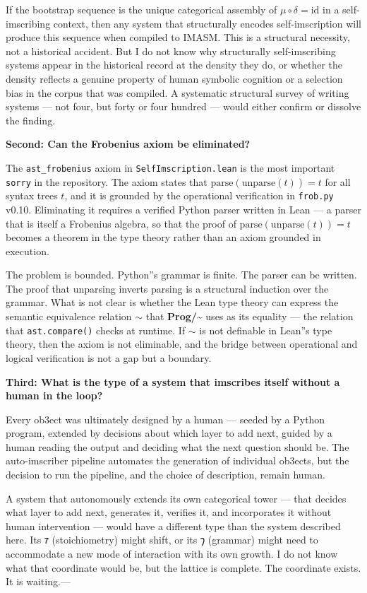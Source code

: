 \documentclass[12pt,a4paper]{article}
\begin{document}
If the bootstrap sequence is the unique categorical assembly of $\mu\circ\delta = \mathrm{id}$ in a self-imscribing context, then any system that structurally encodes self-imscription will produce this sequence when compiled to IMASM. This is a structural necessity, not a historical accident. But I do not know why structurally self-imscribing systems appear in the historical record at the density they do, or whether the density reflects a genuine property of human symbolic cognition or a selection bias in the corpus that was compiled. A systematic structural survey of writing systems --- not four, but forty or four hundred --- would either confirm or dissolve the finding.

\textbf{Second: Can the Frobenius axiom be eliminated?}

The \texttt{ast\_frobenius} axiom in \texttt{SelfImscription.lean} is the most important \texttt{sorry} in the repository. The axiom states that $\text{parse}(\text{unparse}(t)) = t$ for all syntax trees $t$, and it is grounded by the operational verification in \texttt{frob.py} v0.10. Eliminating it requires a verified Python parser written in Lean --- a parser that is itself a Frobenius algebra, so that the proof of $\text{parse}(\text{unparse}(t)) = t$ becomes a theorem in the type theory rather than an axiom grounded in execution.

The problem is bounded. Python''s grammar is finite. The parser can be written. The proof that unparsing inverts parsing is a structural induction over the grammar. What is not clear is whether the Lean type theory can express the semantic equivalence relation $\sim$ that \textbf{Prog/\textasciitilde{}} uses as its equality --- the relation that \texttt{ast.compare()} checks at runtime. If $\sim$ is not definable in Lean''s type theory, then the axiom is not eliminable, and the bridge between operational and logical verification is not a gap but a boundary.

\textbf{Third: What is the type of a system that imscribes itself without a human in the loop?}

Every ob3ect was ultimately designed by a human --- seeded by a Python program, extended by decisions about which layer to add next, guided by a human reading the output and deciding what the next question should be. The auto-imscriber pipeline automates the generation of individual ob3ects, but the decision to run the pipeline, and the choice of description, remain human.

A system that autonomously extends its own categorical tower --- that decides what layer to add next, generates it, verifies it, and incorporates it without human intervention --- would have a different type than the system described here. Its $\text{𐑳}$ (stoichiometry) might shift, or its $\text{𐑠}$ (grammar) might need to accommodate a new mode of interaction with its own growth. I do not know what that coordinate would be, but the lattice is complete. The coordinate exists. It is waiting.---
\end{document}
